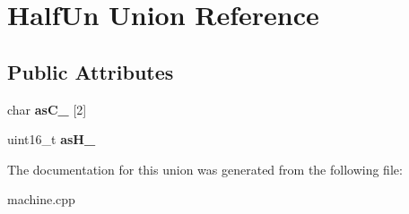 \hypertarget{union_half_un}{}\section{Half\+Un Union Reference}
\label{union_half_un}
\subsection*{Public Attributes}
\begin{DoxyCompactItemize}
\item 
char {\bfseries as\+C\+\_\+} \mbox{[}2\mbox{]}\hypertarget{union_half_un_a512cbf40df74ecb0a6fc7787bdf1fd76}{}\label{union_half_un_a512cbf40df74ecb0a6fc7787bdf1fd76}

\item 
uint16\+\_\+t {\bfseries as\+H\+\_\+}\hypertarget{union_half_un_a618e0aaf29f4a9741341fffda0a4374f}{}\label{union_half_un_a618e0aaf29f4a9741341fffda0a4374f}

\end{DoxyCompactItemize}


The documentation for this union was generated from the following file\+:\begin{DoxyCompactItemize}
\item 
machine.\+cpp\end{DoxyCompactItemize}
